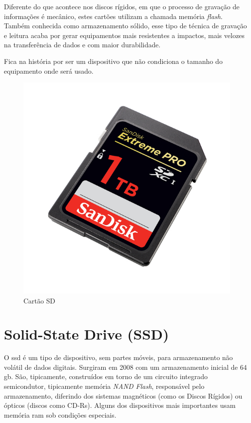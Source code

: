 \documentclass{report}
\begin{document}
	Diferente do que acontece nos discos rígidos, em que o processo de gravação de informações é mecânico, estes cartões utilizam a chamada memória \textit{flash}. Também conhecida como armazenamento sólido, esse tipo de técnica de gravação e leitura acaba por gerar equipamentos mais resistentes a impactos, mais velozes na transferência de dados e com maior durabilidade.
\vspace{1mm}

	Fica na história por ser um dispositivo que não condiciona o tamanho do equipamento onde será usado.
\vspace{1mm}

	\begin{figure} [h]
		\centering
		\includegraphics[scale=0.4]{sdcard.jpg}
		\caption{Cartão SD}
	\end{figure}	

\newpage

		\section{Solid-State Drive (SSD)}
		
	O \ac{ssd} é um tipo de dispositivo, sem partes móveis, para armazenamento não volátil de dados digitais. Surgiram em 2008 com um armazenamento inicial de 64 \ac{gb}. São, tipicamente, construídos em torno de um circuito integrado semicondutor, tipicamente memória \textit{NAND Flash}, responsável pelo armazenamento, diferindo dos sistemas magnéticos (como os Discos Rígidos) ou ópticos (discos como CD-Rs). Alguns dos dispositivos mais importantes usam memória \ac{ram} sob condições especiais.
\vspace{5mm}
\end{document}
